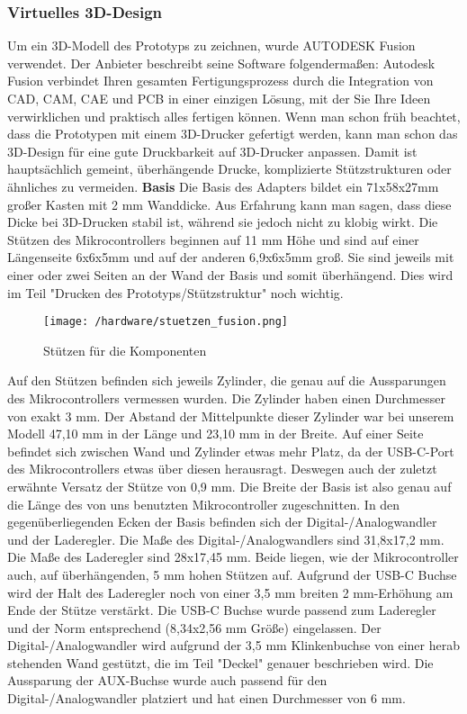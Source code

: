 \documentclass[11pt, twoside]{article}
\begin{document}
\subsubsection{Virtuelles 3D-Design}
Um ein 3D-Modell des Prototyps zu zeichnen, wurde AUTODESK Fusion verwendet. Der Anbieter beschreibt seine Software folgendermaßen: \glqq Autodesk Fusion verbindet Ihren gesamten Fertigungsprozess durch die Integration von CAD, CAM, CAE und PCB in einer einzigen Lösung, mit der Sie Ihre Ideen verwirklichen und praktisch alles fertigen können.\grqq{} \parencite{noauthor_urlnl12_nodate} \newline
Wenn man schon früh beachtet, dass die Prototypen mit einem 3D-Drucker gefertigt werden, kann man schon das 3D-Design für eine gute Druckbarkeit auf 3D-Drucker anpassen. Damit ist hauptsächlich gemeint, überhängende Drucke, komplizierte Stützstrukturen oder ähnliches zu vermeiden.
\vspace{4mm}\newline
\textbf{Basis} \newline
Die Basis des Adapters bildet ein 71x58x27mm großer Kasten mit 2 mm Wanddicke. Aus Erfahrung kann man sagen, dass diese Dicke bei 3D-Drucken stabil ist, während sie jedoch nicht zu klobig wirkt.\newline
Die Stützen des Mikrocontrollers beginnen auf 11 mm Höhe und sind auf einer Längenseite 6x6x5mm und auf der anderen 6,9x6x5mm groß. Sie sind jeweils mit einer oder zwei Seiten an der Wand der Basis und somit überhängend. Dies wird im Teil "Drucken des Prototyps/Stützstruktur" noch wichtig.
\begin{figure}
	\texttt{[image: /hardware/stuetzen\_fusion.png]}
	\caption{Stützen für die Komponenten}
\end{figure}
\noindent Auf den Stützen befinden sich jeweils Zylinder, die genau auf die Aussparungen des Mikrocontrollers vermessen wurden. Die Zylinder haben einen Durchmesser von exakt 3 mm. Der Abstand der Mittelpunkte dieser Zylinder war bei unserem Modell 47,10 mm in der Länge und 23,10 mm in der Breite. Auf einer Seite befindet sich zwischen Wand und Zylinder etwas mehr Platz, da der USB-C-Port des Mikrocontrollers etwas über diesen herausragt. Deswegen auch der zuletzt erwähnte Versatz der Stütze von 0,9 mm.\newline
Die Breite der Basis ist also genau auf die Länge des von uns benutzten Mikrocontroller zugeschnitten.\newline
In den gegenüberliegenden Ecken der Basis befinden sich der Digital-/Analogwandler und der Laderegler. Die Maße des Digital-/Analogwandlers sind 31,8x17,2 mm. Die Maße des Laderegler sind 28x17,45 mm. Beide liegen, wie der Mikrocontroller auch, auf überhängenden, 5 mm hohen Stützen auf. Aufgrund der USB-C Buchse wird der Halt des Laderegler noch von einer 3,5 mm breiten 2 mm-Erhöhung am Ende der Stütze verstärkt. Die USB-C Buchse wurde passend zum Laderegler und der Norm entsprechend (8,34x2,56 mm Größe) eingelassen. Der Digital-/Analogwandler wird aufgrund der 3,5 mm Klinkenbuchse von einer herab stehenden Wand gestützt, die im Teil "Deckel" genauer beschrieben wird. Die Aussparung der AUX-Buchse wurde auch passend für den Digital-/Analogwandler platziert und hat einen Durchmesser von 6 mm.\newline
\end{document}
